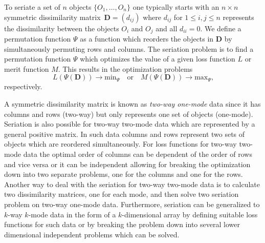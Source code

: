 \documentclass[fleqn, a4paper]{article}
\begin{document}
To seriate a set of $n$ objects $\{O_1,\dots,O_n\}$ one typically starts with an
$n \times n$ symmetric dissimilarity matrix~$\mathbf{D} = (d_{ij})$ where
$d_{ij}$ for $1 \le i,j \le n$ represents the dissimilarity between the objects
$O_i$ and $O_j$ and all $d_{ii} = 0$.  We define a permutation function $\Psi$
as a function which reorders the objects in $\mathbf{D}$ by simultaneously
permuting rows and columns.  The seriation problem is to find a permutation
function $\Psi$
which optimizes the value of a given loss function $L$ or merit function $M$.
This results in the optimization problems
\begin{equation}
    L(\Psi(\mathbf{D})) \rightarrow \mathrm{min}_\Psi \quad \text{or} \quad
    M(\Psi(\mathbf{D})) \rightarrow \mathrm{max}_\Psi\text{,}
\end{equation}
respectively.

A symmetric dissimilarity matrix is known as \emph{two-way one-mode}
data since it has columns and rows (two-way) but only represents one set
of objects (one-mode).  Seriation is also possible for two-way two-mode
data which are represented by a general positive matrix.  In such data
columns and rows represent two sets of objects which are reordered
simultaneously.  For loss functions for two-way two-mode data the
optimal order of columns can be dependent of the order of rows and vice
versa or it can be independent allowing for breaking the optimization
down into two separate problems, one for the columns and one for the
rows.  Another way to deal with the seriation for two-way two-mode data
is to calculate two dissimilarity matrices, one for each mode, and then
solve two seriation problem on two-way one-mode data.  Furthermore,
seriation can be generalized to $k$-way $k$-mode data in the form of a
$k$-dimensional array by defining suitable loss functions for such data
or by breaking the problem down into several lower dimensional
independent problems which can be solved.
\end{document}
